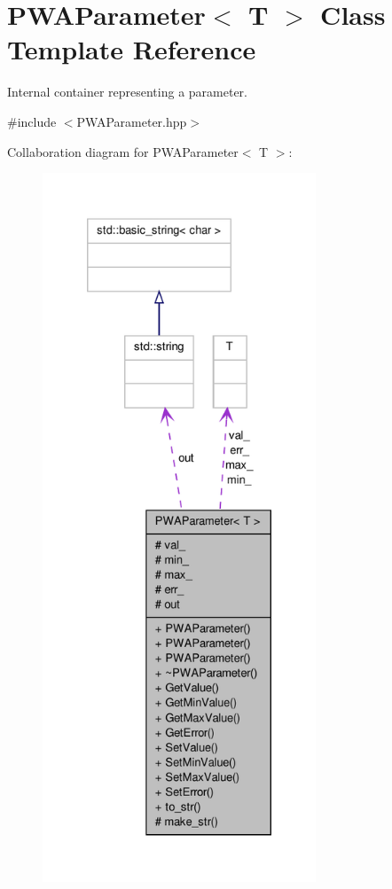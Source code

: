 \hypertarget{classPWAParameter}{
\section{PWAParameter$<$ T $>$ Class Template Reference}
\label{d2/d41/classPWAParameter}
}


Internal container representing a parameter.  




{\ttfamily \#include $<$PWAParameter.hpp$>$}



Collaboration diagram for PWAParameter$<$ T $>$:\nopagebreak
\begin{figure}[H]
\begin{center}
\leavevmode
\includegraphics[height=600pt]{de/d75/classPWAParameter__coll__graph}
\end{center}
\end{figure}
